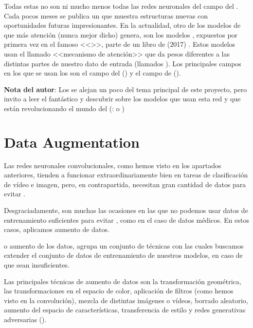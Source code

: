 Todas estas no son ni mucho menos todas las redes neuronales del campo del . Cada pocos meses se publica un  que muestra estructuras nuevas con oportunidades futuras impresionantes. En la actualidad, otro de los modelos de  que más atención (nunca mejor dicho) genera, son los modelos , expuestos por primera vez en el famoso  <<>>, parte de un libro de (2017) . Estos modelos usan el llamado <<mecanismo de atención>> que da pesos diferentes a las distintas partes de nuestro dato de entrada (llamados ). Los principales campos en los que se usan los  son el campo del  () y el campo de  ().

\textbf{Nota del autor}: Los  se alejan un poco del tema principal de este proyecto, pero invito a leer el fantástico  y descubrir sobre los modelos que usan esta red y que están revolucionando el mundo del  (\pe:  o )

\section{Data Augmentation}

Las redes neuronales convolucionales, como hemos visto en los apartados anteriores, tienden a funcionar
extraordinariamente bien en tareas de clasificación de vídeo e imagen, pero, en contrapartida, necesitan gran cantidad de datos para evitar  .

Desgraciadamente, son muchas las ocasiones en las que no podemos usar datos de entrenamiento suficientes para evitar , como en el caso de datos médicos. En estos casos, aplicamos aumento de datos.

 o aumento de los datos, agrupa un conjunto de técnicas con las cuales buscamos extender el conjunto de datos de entrenamiento de nuestros modelos, en caso de que sean insuficientes.

Las principales técnicas de aumento de datos son la transformación geométrica, las transformaciones en el espacio de color, aplicación de filtros  (como hemos visto en la convolución), mezcla de distintas imágenes o vídeos, borrado aleatorio, aumento del espacio de características, transferencia de estilo y redes generativas adversarias ().

